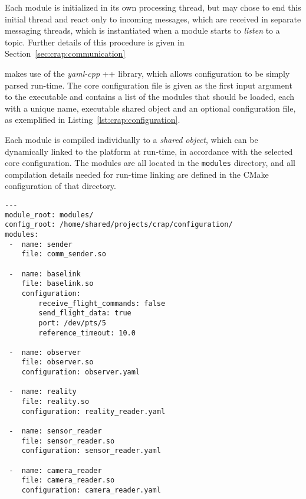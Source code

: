         Each module is initialized in its own processing thread, but may
        chose to end this initial thread and react only to
        incoming messages, which are received in separate messaging threads,
        which is instantiated when a module starts to \textit{listen} to a topic.
        Further details of this procedure is given in Section~\ref{sec:crap:communication}

        \crap makes use of the \textit{yaml-cpp} \C++ library, which allows
        configuration to be simply parsed run-time. The core configuration
        file is given as the first input argument to the \crap executable
        and contains a list of the modules that should be loaded, each with
        a unique name, executable shared object and an optional configuration file,
        as exemplified in Listing~\ref{lst:crap:configuration}.

        Each module is compiled individually to a \textit{shared object},
        which can be dynamically linked to the \crap platform at run-time, in accordance
        with the selected core configuration.
        The modules are all located in the \texttt{modules} directory,
        and all compilation details needed for run-time linking are defined in the CMake
        configuration of that directory.

        \begin{minipage}{\textwidth}
        \begin{lstlisting}
---
module_root: modules/
config_root: /home/shared/projects/crap/configuration/
modules:
 -  name: sender
    file: comm_sender.so

 -  name: baselink
    file: baselink.so
    configuration:
        receive_flight_commands: false
        send_flight_data: true
        port: /dev/pts/5
        reference_timeout: 10.0

 -  name: observer
    file: observer.so
    configuration: observer.yaml

 -  name: reality
    file: reality.so
    configuration: reality_reader.yaml

 -  name: sensor_reader
    file: sensor_reader.so
    configuration: sensor_reader.yaml

 -  name: camera_reader
    file: camera_reader.so
    configuration: camera_reader.yaml
        \end{lstlisting}
        \end{minipage}

